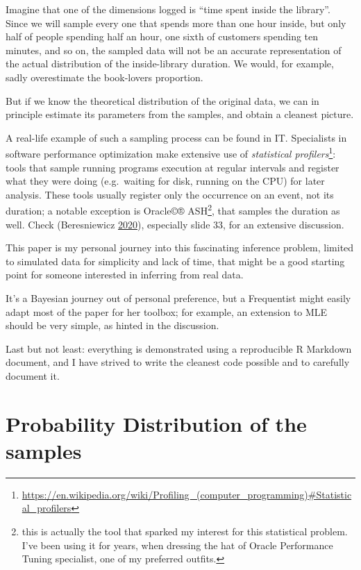 \documentclass[]{article}
\begin{document}
Imagine that one of the dimensions logged is ``time spent inside the
library''. Since we will sample every one that spends more than one hour
inside, but only half of people spending half an hour, one sixth of
customers spending ten minutes, and so on, the sampled data will not be
an accurate representation of the actual distribution of the
inside-library duration. We would, for example, sadly overestimate the
book-lovers proportion.

But if we know the theoretical distribution of the original data, we can
in principle estimate its parameters from the samples, and obtain a
cleanest picture.

A real-life example of such a sampling process can be found in IT.
Specialists in software performance optimization make extensive use of
\emph{statistical profilers}\footnote{\url{https://en.wikipedia.org/wiki/Profiling_(computer_programming)\#Statistical_profilers}}:
tools that sample running programs execution at regular intervals and
register what they were doing (e.g.~waiting for disk, running on the
CPU) for later analysis. These tools usually register only the
occurrence on an event, not its duration; a notable exception is
Oracle©® ASH\footnote{this is actually the tool that sparked my interest
  for this statistical problem. I've been using it for years, when
  dressing the hat of Oracle Performance Tuning specialist, one of my
  preferred outfits.}, that samples the duration as well. Check
(Beresniewicz \protect\hyperlink{ref-ASHMATH}{2020}), especially slide
33, for an extensive discussion.

This paper is my personal journey into this fascinating inference
problem, limited to simulated data for simplicity and lack of time, that
might be a good starting point for someone interested in inferring from
real data.

It's a Bayesian journey out of personal preference, but a Frequentist
might easily adapt most of the paper for her toolbox; for example, an
extension to MLE should be very simple, as hinted in the discussion.

Last but not least: everything is demonstrated using a reproducible R
Markdown document, and I have strived to write the cleanest code
possible and to carefully document it.

\hypertarget{probability-distribution-of-the-samples}{%
\section{Probability Distribution of the
samples}\label{probability-distribution-of-the-samples}}
\end{document}
